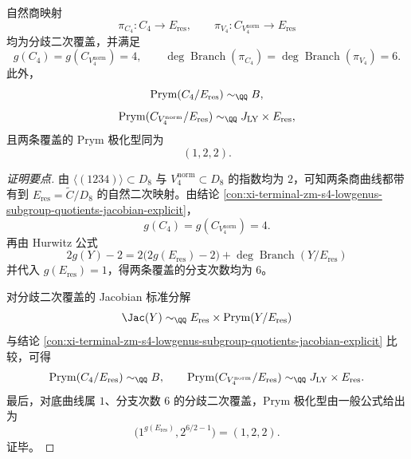 \begin{conclusion}\label{con:xi-terminal-zm-s4-two-genus4-doublecovers-prym-identification}
自然商映射
\[
\pi_{C_4}:C_4\longrightarrow E_{\mathrm{res}},\qquad
\pi_{V_4}:C_{V_4^{\mathrm{norm}}}\longrightarrow E_{\mathrm{res}}
\]
均为分歧二次覆盖，并满足
\[
g(C_4)=g(C_{V_4^{\mathrm{norm}}})=4,\qquad
\deg\operatorname{Branch}(\pi_{C_4})=\deg\operatorname{Branch}(\pi_{V_4})=6.
\]
此外，
\[
\operatorname{Prym}(C_4/E_{\mathrm{res}})\sim_{\QQ}B,
\]
\[
\operatorname{Prym}(C_{V_4^{\mathrm{norm}}}/E_{\mathrm{res}})\sim_{\QQ}J_{\mathrm{LY}}\times E_{\mathrm{res}},
\]
且两条覆盖的 Prym 极化型同为
\[
(1,2,2).
\]
\end{conclusion}
\begin{proof}[证明要点]
由 \(\langle(1234)\rangle\subset D_8\) 与 \(V_4^{\mathrm{norm}}\subset D_8\) 的指数均为 \(2\)，可知两条商曲线都带有到
\(
E_{\mathrm{res}}=\widetilde C/D_8
\)
的自然二次映射。由结论
\ref{con:xi-terminal-zm-s4-lowgenus-subgroup-quotients-jacobian-explicit}，
\[
g(C_4)=g(C_{V_4^{\mathrm{norm}}})=4.
\]
再由 Hurwitz 公式
\[
2g(Y)-2=2\bigl(2g(E_{\mathrm{res}})-2\bigr)+\deg\operatorname{Branch}(Y/E_{\mathrm{res}})
\]
并代入 \(g(E_{\mathrm{res}})=1\)，得两条覆盖的分支次数均为 \(6\)。

对分歧二次覆盖的 Jacobian 标准分解
\[
\Jac(Y)\sim_{\QQ}E_{\mathrm{res}}\times \operatorname{Prym}(Y/E_{\mathrm{res}})
\]
与结论
\ref{con:xi-terminal-zm-s4-lowgenus-subgroup-quotients-jacobian-explicit}
比较，可得
\[
\operatorname{Prym}(C_4/E_{\mathrm{res}})\sim_{\QQ}B,
\qquad
\operatorname{Prym}(C_{V_4^{\mathrm{norm}}}/E_{\mathrm{res}})\sim_{\QQ}J_{\mathrm{LY}}\times E_{\mathrm{res}}.
\]
最后，对底曲线属 \(1\)、分支次数 \(6\) 的分歧二次覆盖，Prym 极化型由一般公式给出为
\[
\bigl(1^{g(E_{\mathrm{res}})},2^{6/2-1}\bigr)=(1,2,2).
\]
证毕。
\end{proof}

